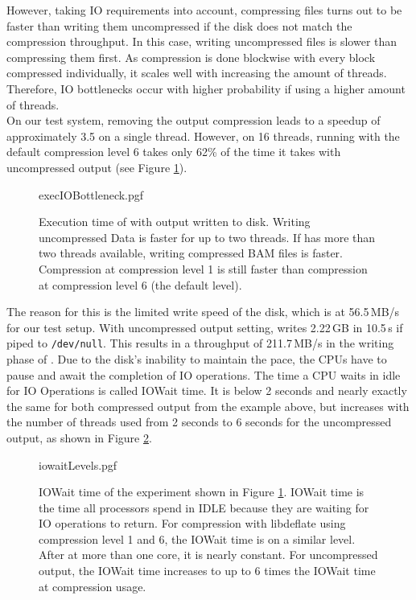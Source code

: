 However, taking IO requirements into account, compressing files turns out to be faster than writing them uncompressed if the disk does not match the compression throughput. In this case, writing uncompressed files is slower than compressing them first. As compression is done blockwise with every block compressed individually, it scales well with increasing the amount of threads. Therefore, IO bottlenecks occur with higher probability if using a higher amount of threads. \\
On our test system, removing the output compression leads to a speedup of approximately 3.5 on a single thread. However, on 16 threads, running \sort with the default compression level 6 takes only 62\% of the time it takes with uncompressed output (see Figure \ref{fig:execIO}). \\
\begin{figure}[t]
        {execIOBottleneck.pgf}
    \caption{Execution time of \sort with output written to disk. Writing uncompressed Data is faster for up to two threads. If \sort has more than two threads available, writing compressed BAM files is faster. Compression at compression level 1 is still faster than compression at compression level 6 (the default level).}
    \label{fig:execIO}
\end{figure}
The reason for this is the limited write speed of the disk, which is at 56.5\,MB/s for our test setup. With uncompressed output setting, \sort writes 2.22\,GB in 10.5\,s if piped to \texttt{/dev/null}. This results in a throughput of 211.7\,MB/s in the writing phase of \sort. Due to the disk's inability to maintain the pace, the CPUs have to pause and await the completion of IO operations. The time a CPU waits in idle for IO Operations is called IOWait time. It is below 2 seconds and nearly exactly the same for both compressed output from the example above, but increases with the number of threads used from 2 seconds to 6 seconds for the uncompressed output, as shown in Figure \ref{fig:iowait}.
\begin{figure}
        {iowaitLevels.pgf}
    \caption{IOWait time of the experiment shown in Figure \ref{fig:execIO}. IOWait time is the time all processors spend in IDLE because they are waiting for IO operations to return. For compression with libdeflate using compression level 1 and 6, the IOWait time is on a similar level. After at more than one core, it is nearly constant. For uncompressed output, the IOWait time increases to up to 6 times the IOWait time at compression usage. }
    \label{fig:iowait}
\end{figure}




